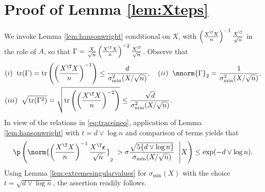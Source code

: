 \documentclass[11pt]{article}
\def\tr{\mathrm{tr}}
\def\eps{\boldsymbol{\epsilon}}
\begin{document}
\section{Proof of Lemma \ref{lem:Xteps}}\label{app:Xteps}
We invoke Lemma \ref{lem:hansonwright} conditional on $X$, with $\left(\frac{X^{\T} X}{n} \right)^{-1} \frac{X^{\T}}{\sqrt{n}}$ in the role of $A$, so that
$\Gamma = \frac{X}{\sqrt{n}} \left(\frac{X^{\T} X}{n} \right)^{-2} \frac{X^{\T}}{\sqrt{n}}$. Observe that 
\begin{align}\label{eq:traceineq}
\begin{split}
&(i)\;\;\tr(\Gamma) = \tr\left( \left(\frac{X^{\T} X}{n} \right)^{-1} \right) \leq  \frac{d}{\sigma^2_{\min}(X / \sqrt{n})}, \quad (ii) \;\; \nnorm{\Gamma}_2 = \frac{1}{\sigma^2_{\min}(X / \sqrt{n})}, \\
&(iii)\;\;\sqrt{\tr(\Gamma^2)} = \sqrt{\tr \left(\left(\frac{X^{\T} X}{n} \right)^{-2} \right)} \leq  \frac{\sqrt{d}}{\sigma^2_{\min}(X/\sqrt{n})}.
\end{split}
\end{align}
In view of the relations in \eqref{eq:traceineq}, application of Lemma \ref{lem:hansonwright} with $t = d \vee \log n$ and comparison of terms yields that
\begin{equation*}
  \p\left(\norm{ \left(\frac{X^{\T} X}{n} \right)^{-1} \frac{X^{\T} \eps}{\sqrt{n}}}_2 \; >  \sigma \frac{\sqrt{5 \{d \vee \log n \}}}{\sigma_{\min}(X / \sqrt{n})} \; \; \Bigg| X \right)
  \leq \exp(-d \vee \log n). 
\end{equation*}
Using Lemma \ref{lem:extremesingularvalues} for $\sigma_{\min}(X)$ with the choice $t = \sqrt{d \vee \log n}$, the assertion readily follows.    
\end{document}

